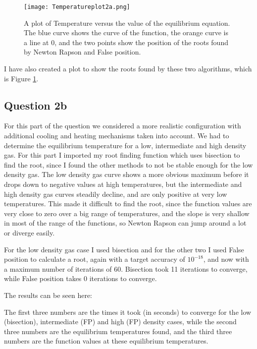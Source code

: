 \begin{figure}[ht!]
  \centering
  \texttt{[image: Temperatureplot2a.png]}
  \caption{A plot of Temperature versus the value of the equilibrium equation. The blue curve shows the curve of the function, the orange curve is a line at 0, and the two points show the position of the roots found by Newton Rapson and False position.}
  \label{fig:Temp}
\end{figure}

I have also created a plot to show the roots found by these two algorithms, which is Figure \ref{fig:Temp}.

\subsection{Question 2b}

For this part of the question we considered a more realistic configuration with additional cooling and heating mechanisms taken into account.
We had to determine the equilibrium temperature for a low, intermediate and high density gas. 
For this part I imported my root finding function which uses bisection to find the root, since I found the other methods to not be stable enough for the low density gas.
The low density gas curve shows a more obvious maximum before it drops down to negative values at high temperatures, but the intermediate and high density gas curves steadily decline, and are only positive at very low temperatures.
This made it difficult to find the root, since the function values are very close to zero over a big range of temperatures, and the slope is very shallow in most of the range of the functions, so Newton Rapson can jump around a lot or diverge easily.

For the low density gas case I used bisection and for the other two I used False position to calculate a root, again with a target accuracy of $10^{-18}$, and now with a maximum number of iterations of 60.
Bisection took 11 iterations to converge, while False position takes 0 iterations to converge.

The results can be seen here:



The first three numbers are the times it took (in seconds) to converge for the low (bisection), intermediate (FP) and high (FP) density cases, while the second three numbers are the equilibrium temperatures found, and the third three numbers are the function values at these equilibrium temperatures.







